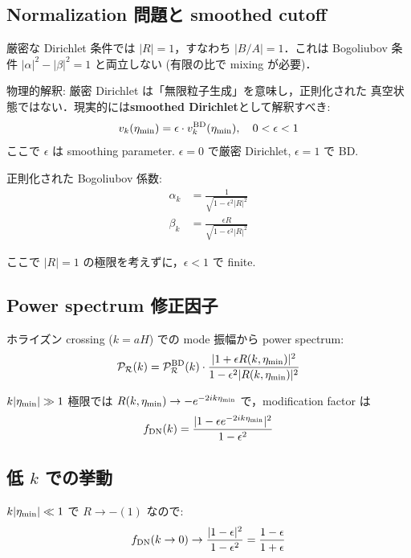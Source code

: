 \documentclass[11pt,a4paper]{article}
\begin{document}
\subsection{Normalization 問題と smoothed cutoff}

厳密な Dirichlet 条件では $|R| = 1$，すなわち $|B/A| = 1$．これは
Bogoliubov 条件 $|\alpha|^2 - |\beta|^2 = 1$ と両立しない (有限の比で
mixing が必要)．

物理的解釈: 厳密 Dirichlet は「無限粒子生成」を意味し，正則化された
真空状態ではない．現実的には\textbf{smoothed Dirichlet}として解釈すべき:
\begin{equation}
v_k(\eta_{\rm min}) = \epsilon\cdot v_k^{\rm BD}(\eta_{\rm min}),\quad
0 < \epsilon < 1
\end{equation}
ここで $\epsilon$ は smoothing parameter. $\epsilon = 0$ で厳密 Dirichlet,
$\epsilon = 1$ で BD.

正則化された Bogoliubov 係数:
\begin{align}
\alpha_k &= \frac{1}{\sqrt{1 - \epsilon^2 |R|^2}}\\
\beta_k &= \frac{\epsilon R}{\sqrt{1 - \epsilon^2 |R|^2}}
\end{align}

ここで $|R| = 1$ の極限を考えずに，$\epsilon < 1$ で finite.

\subsection{Power spectrum 修正因子}

ホライズン crossing ($k = aH$) での mode 振幅から power spectrum:
\begin{equation}
\mathcal{P}_\mathcal{R}(k) = \mathcal{P}_\mathcal{R}^{\rm BD}(k)\cdot
\frac{|1 + \epsilon R(k,\eta_{\rm min})|^2}{1 - \epsilon^2 |R(k,\eta_{\rm min})|^2}
\end{equation}

$k|\eta_{\rm min}| \gg 1$ 極限では $R(k, \eta_{\rm min}) \to -e^{-2ik\eta_{\rm min}}$
で，modification factor は
\begin{equation}
f_{\rm DN}(k) = \frac{|1 - \epsilon e^{-2ik\eta_{\rm min}}|^2}{1 - \epsilon^2}
\end{equation}

\subsection{低 $k$ での挙動}

$k|\eta_{\rm min}| \ll 1$ で $R \to -(1)$ なので:
\begin{equation}
f_{\rm DN}(k \to 0) \to \frac{|1 - \epsilon|^2}{1 - \epsilon^2}
= \frac{1 - \epsilon}{1 + \epsilon}
\end{equation}
\end{document}
